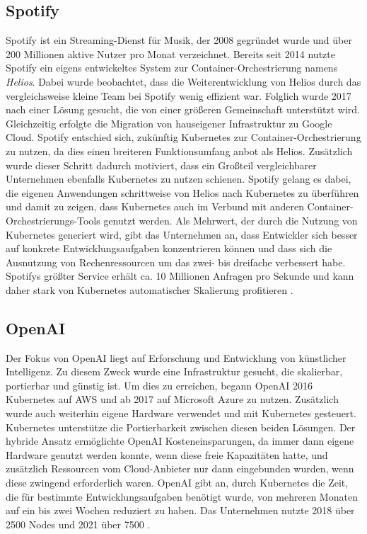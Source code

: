 \documentclass[11pt,a4paper]{article}
\begin{document}
\subsection{Spotify}
Spotify ist ein Streaming-Dienst für Musik, der 2008 gegründet wurde
und über 200 Millionen aktive Nutzer pro Monat verzeichnet.
Bereits seit 2014 nutzte Spotify ein eigens entwickeltes System zur Container-Orchestrierung
namens \emph{Helios}. Dabei wurde beobachtet, dass die Weiterentwicklung von Helios
durch das vergleichsweise kleine Team bei Spotify wenig effizient war.
Folglich wurde 2017 nach einer Lösung gesucht, die von einer größeren Gemeinschaft
unterstützt wird. Gleichzeitig erfolgte die Migration von hauseigener Infrastruktur
zu Google Cloud. Spotify entschied sich, zukünftig Kubernetes zur Container-Orchestrierung zu nutzen, %
da dies einen breiteren Funktionsumfang anbot als Helios.
Zusätzlich wurde dieser Schritt dadurch motiviert, dass ein Großteil
vergleichbarer Unternehmen ebenfalls Kubernetes zu nutzen schienen.
Spotify gelang es dabei, die eigenen Anwendungen schrittweise
von Helios nach Kubernetes zu überführen und damit zu zeigen, dass Kubernetes
auch im Verbund mit anderen Container-Orchestrierungs-Tools genutzt werden.
Als Mehrwert, der durch die Nutzung von Kubernetes generiert wird,
gibt das Unternehmen an, dass Entwickler sich besser auf konkrete Entwicklungsaufgaben
konzentrieren können und dass sich die Ausnutzung von Rechenressourcen
um das zwei- bis dreifache verbessert habe.
Spotifys größter Service erhält ca. 10 Millionen Anfragen pro Sekunde
und kann daher stark von Kubernetes automatischer Skalierung profitieren \cite{story_spotify}.

\subsection{OpenAI}
Der Fokus von OpenAI liegt auf Erforschung und Entwicklung von künstlicher Intelligenz.
Zu diesem Zweck wurde eine Infrastruktur gesucht, die skalierbar, portierbar und günstig ist.
Um dies zu erreichen, begann OpenAI 2016 Kubernetes auf AWS und ab 2017 auf
Microsoft Azure zu nutzen. Zusätzlich wurde auch weiterhin eigene Hardware verwendet
und mit Kubernetes gesteuert.
Kubernetes unterstütze die Portierbarkeit zwischen diesen beiden Lösungen.
Der hybride Ansatz ermöglichte OpenAI Kosteneinsparungen,
da immer dann eigene Hardware genutzt werden konnte, wenn diese freie Kapazitäten hatte,
und zusätzlich Ressourcen vom Cloud-Anbieter nur dann eingebunden wurden,
wenn diese zwingend erforderlich waren.
OpenAI gibt an, durch Kubernetes die Zeit, die für bestimmte Entwicklungsaufgaben
benötigt wurde, von mehreren Monaten auf ein bis zwei Wochen reduziert zu haben.
Das Unternehmen nutzte 2018 über 2500 Nodes \cite{openai_scaling_2500} und 2021 über 7500 \cite{openai_scaling_7500} \cite{story_openai}.
\end{document}
